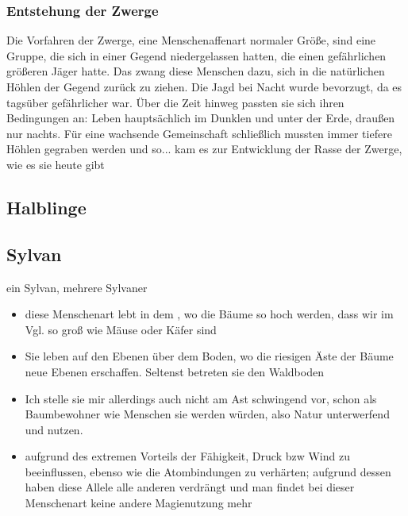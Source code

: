 \subsubsection{Entstehung der Zwerge}
Die Vorfahren der Zwerge, eine Menschenaffenart normaler Größe, sind eine Gruppe, die sich in einer Gegend niedergelassen hatten, die einen gefährlichen größeren Jäger hatte. Das zwang diese Menschen dazu, sich in die natürlichen Höhlen der Gegend zurück zu ziehen. Die Jagd bei Nacht wurde bevorzugt, da es tagsüber gefährlicher war. Über die Zeit hinweg passten sie sich ihren Bedingungen an: Leben hauptsächlich im Dunklen und unter der Erde, draußen nur nachts. Für eine wachsende Gemeinschaft schließlich mussten immer tiefere Höhlen gegraben werden und so... kam es zur Entwicklung der Rasse der Zwerge, wie es sie heute gibt



\subsection{Halblinge} \label{rasse:halblinge}

\subsection{Sylvan} \label{rasse:sylvan}
ein Sylvan, mehrere Sylvaner
\begin{itemize}
	\item diese Menschenart lebt in dem , wo die Bäume so hoch werden, dass wir im Vgl. so groß wie Mäuse oder Käfer sind
	\item Sie leben auf den Ebenen über dem Boden, wo die riesigen Äste der Bäume neue Ebenen erschaffen. Seltenst betreten sie den Waldboden
	\item Ich stelle sie mir allerdings auch nicht am Ast schwingend vor, schon als Baumbewohner wie Menschen sie werden würden, also Natur unterwerfend und nutzen.
	\item aufgrund des extremen Vorteils der Fähigkeit, Druck bzw Wind zu beeinflussen, ebenso wie die Atombindungen zu verhärten; aufgrund dessen haben diese Allele alle anderen verdrängt und man findet bei dieser Menschenart keine andere Magienutzung mehr
\end{itemize}

